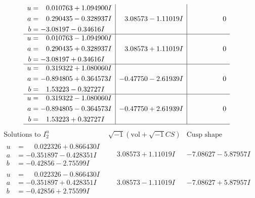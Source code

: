 \documentclass[1p]{elsarticle_modified}
\theoremstyle{definition}
\newcommand{\I}{\sqrt{-1}}
\begin{document}
$$\begin{array}{c|c|c}
\begin{aligned}
u &= \phantom{-}0.010763 + 1.094900 I \\
a &= \phantom{-}0.290435 - 0.328937 I \\
b &= -3.08197 - 0.34616 I\end{aligned}
 & \phantom{-}3.08573 - 1.11019 I & \phantom{-0.000000 } 0 \\ \hline\begin{aligned}
u &= \phantom{-}0.010763 - 1.094900 I \\
a &= \phantom{-}0.290435 + 0.328937 I \\
b &= -3.08197 + 0.34616 I\end{aligned}
 & \phantom{-}3.08573 + 1.11019 I & \phantom{-0.000000 } 0 \\ \hline\begin{aligned}
u &= \phantom{-}0.319322 + 1.080060 I \\
a &= -0.894805 + 0.364573 I \\
b &= \phantom{-}1.53223 - 0.32727 I\end{aligned}
 & -0.47750 - 2.61939 I & \phantom{-0.000000 } 0 \\ \hline\begin{aligned}
u &= \phantom{-}0.319322 - 1.080060 I \\
a &= -0.894805 - 0.364573 I \\
b &= \phantom{-}1.53223 + 0.32727 I\end{aligned}
 & -0.47750 + 2.61939 I & \phantom{-0.000000 } 0\\
 \hline 
 \end{array}$$\newpage$$\begin{array}{c|c|c}  
\text{Solutions to }I^u_{2}& \I (\text{vol} + \sqrt{-1}CS) & \text{Cusp shape}\\
 \hline 
\begin{aligned}
u &= \phantom{-}0.022326 + 0.866430 I \\
a &= -0.351897 - 0.428351 I \\
b &= -0.42856 - 2.75599 I\end{aligned}
 & \phantom{-}3.08573 + 1.11019 I & -7.08627 - 5.87957 I \\ \hline\begin{aligned}
u &= \phantom{-}0.022326 - 0.866430 I \\
a &= -0.351897 + 0.428351 I \\
b &= -0.42856 + 2.75599 I\end{aligned}
 & \phantom{-}3.08573 - 1.11019 I & -7.08627 + 5.87957 I \\ \hline\begin{aligned}

\end{aligned}
\end{array}$$
\end{document}
